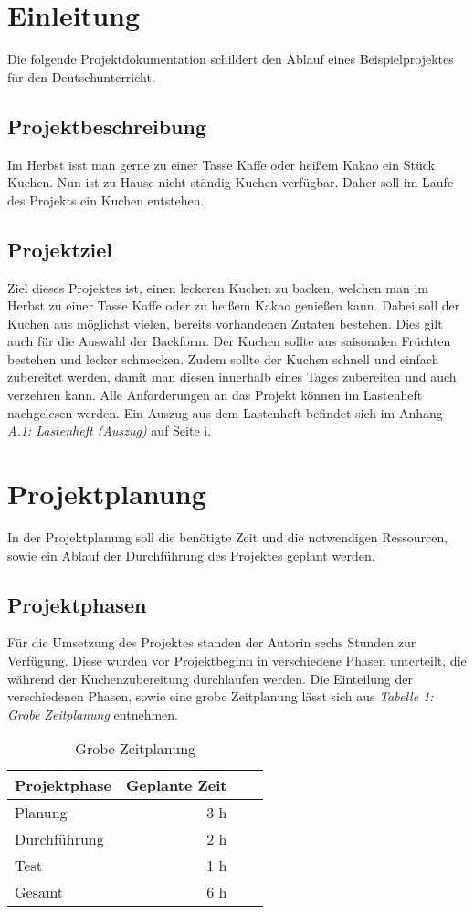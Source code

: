 \section{Einleitung}
Die folgende Projektdokumentation schildert den Ablauf eines Beispielprojektes für den Deutschunterricht.

\subsection{Projektbeschreibung}
Im Herbst isst man gerne zu einer Tasse Kaffe oder heißem Kakao ein Stück Kuchen. Nun ist zu Hause nicht ständig Kuchen verfügbar. Daher soll im Laufe des Projekts ein Kuchen entstehen.

\subsection{Projektziel}
Ziel dieses Projektes ist, einen leckeren Kuchen zu backen, welchen man im Herbst zu einer Tasse Kaffe oder zu heißem Kakao genießen kann.
Dabei soll der Kuchen aus möglichst vielen, bereits vorhandenen Zutaten bestehen. Dies gilt auch für die Auswahl der Backform.
Der Kuchen sollte aus saisonalen Früchten bestehen und lecker schmecken. Zudem sollte der Kuchen schnell und einfach zubereitet werden,
damit man diesen innerhalb eines Tages zubereiten und auch verzehren kann. Alle Anforderungen an das Projekt können im Lastenheft nachgelesen werden.
Ein Auszug aus dem Lastenheft befindet sich im Anhang \emph{A.1: Lastenheft (Auszug)} auf Seite i.

\section{Projektplanung}
In der Projektplanung soll die benötigte Zeit und die notwendigen Ressourcen, sowie ein Ablauf der Durchführung des Projektes geplant werden.

\subsection{Projektphasen}
Für die Umsetzung des Projektes standen der Autorin sechs Stunden zur Verfügung. Diese wurden vor Projektbeginn in verschiedene Phasen
unterteilt, die während der Kuchenzubereitung durchlaufen werden. Die Einteilung der verschiedenen Phasen, sowie eine grobe Zeitplanung lässt sich aus \emph{Tabelle 1: Grobe Zeitplanung} entnehmen.
\begin{table}[h]
    \centering
    \begin{tabular}{l*{2}{r}r|}
        \hline
        Projektphase    & Geplante Zeit \\
        \hline
        Planung & 3 h\\
        Durchführung    & 2 h  \\
        Test      & 1 h   \\
        \hline
        Gesamt & 6 h \\
        \hline
        \end{tabular}
        \caption{Grobe Zeitplanung}
\end{table}
